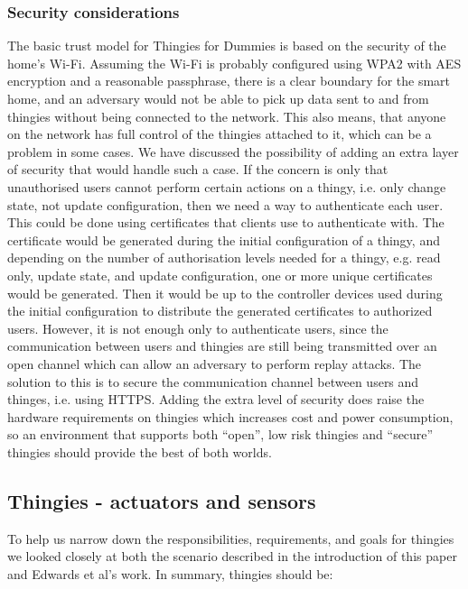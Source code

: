 \documentclass{ubicomp2012}
\begin{document}
\subsubsection{Security considerations}

The basic trust model for Thingies for Dummies is based on the security of the home's Wi-Fi. Assuming the Wi-Fi is probably configured using WPA2 with AES encryption and a reasonable passphrase, there is a clear boundary for the smart home, and an adversary would not be able to pick up data sent to and from thingies without being connected to the network. This also means, that anyone on the network has full control of the thingies attached to it, which can be a problem in some cases. We have discussed the possibility of adding an extra layer of security that would handle such a case. If the concern is only that unauthorised users cannot perform certain actions on a thingy, i.e. only change state, not update configuration, then we need a way to authenticate each user. This could be done using certificates that clients use to authenticate with. The certificate would be generated during the initial configuration of a thingy, and depending on the number of authorisation levels needed for a thingy, e.g. read only, update state, and update configuration, one or more unique certificates would be generated. Then it would be up to the controller devices used during the initial configuration to distribute the generated certificates to authorized users. However, it is not enough only to authenticate users, since the communication between users and thingies are still being transmitted over an open channel which can allow an adversary to perform replay attacks. The solution to this is to secure the communication channel between users and thinges, i.e. using HTTPS. Adding the extra level of security does raise the hardware requirements on thingies which increases cost and power consumption, so an environment that supports both ``open'', low risk thingies and ``secure'' thingies should provide the best of both worlds.

\subsection{Thingies - actuators and sensors}

To help us narrow down the responsibilities, requirements, and goals for thingies we looked closely at both the scenario described in the introduction of this paper and Edwards et al's \cite{Edwards01athome} work. In summary, thingies should be:
\end{document}
